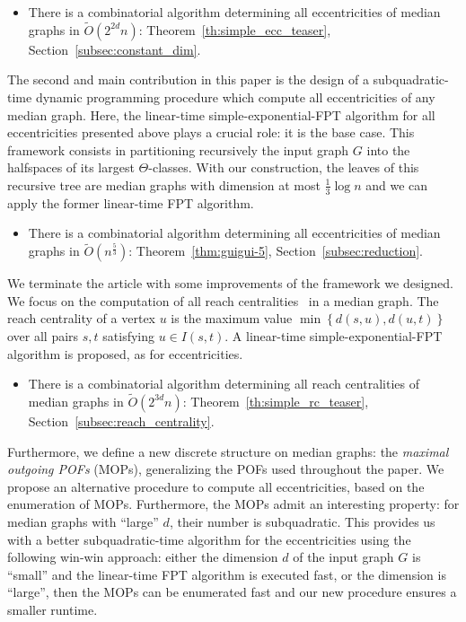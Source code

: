 \documentclass[a4paper,UKenglish,numberwithinsect,cleveref, autoref,anonymous]{lipics-v2021}
\newcommand{\set}[1]{\left\{ #1 \right\}}
\begin{document}
\begin{itemize}
\item There is a combinatorial algorithm determining all eccentricities of median graphs in $\tilde{O}(2^{2d}n)$: Theorem~\ref{th:simple_ecc_teaser}, Section~\ref{subsec:constant_dim}.
\end{itemize}

The second and main contribution in this paper is the design of a subquadratic-time dynamic programming procedure which compute all eccentricities of any median graph. Here, the linear-time simple-exponential-FPT algorithm for all eccentricities presented above plays a crucial role: it is the base case. This framework consists in partitioning recursively the input graph $G$ into the halfspaces of its largest $\Theta$-classes. With our construction, the leaves of this recursive tree are median graphs with dimension at most $\frac{1}{3}\log n$ and we can apply the former linear-time FPT algorithm.

\begin{itemize}
    \item There is a combinatorial algorithm determining all eccentricities of median graphs in $\tilde{O}(n^{\frac{5}{3}})$: Theorem~\ref{thm:guigui-5}, Section~\ref{subsec:reduction}.
\end{itemize}

We terminate the article with some improvements of the framework we designed. We focus on the computation of all reach centralities~\cite{Gu04} in a median graph. The reach centrality of a vertex $u$ is the maximum value $\min \set{d(s,u),d(u,t)}$ over all pairs $s,t$ satisfying $u \in I(s,t)$. A linear-time simple-exponential-FPT algorithm is proposed, as for eccentricities.

\begin{itemize}
    \item There is a combinatorial algorithm determining all reach centralities of median graphs in $\tilde{O}(2^{3d}n)$: Theorem~\ref{th:simple_rc_teaser}, Section~\ref{subsec:reach_centrality}.
\end{itemize}

Furthermore, we define a new discrete structure on median graphs: the \textit{maximal outgoing POFs} (MOPs), generalizing the POFs used throughout the paper. We propose an alternative procedure to compute all eccentricities, based on the enumeration of MOPs. Furthermore, the MOPs admit an interesting property: for median graphs with ``large'' $d$, their number is subquadratic. This provides us with a better subquadratic-time algorithm for the eccentricities using the following win-win approach: either the dimension $d$ of the input graph $G$ is ``small'' and the linear-time FPT algorithm is executed fast, or the dimension is ``large'', then the MOPs can be enumerated fast and our new procedure ensures a smaller runtime.
\end{document}
